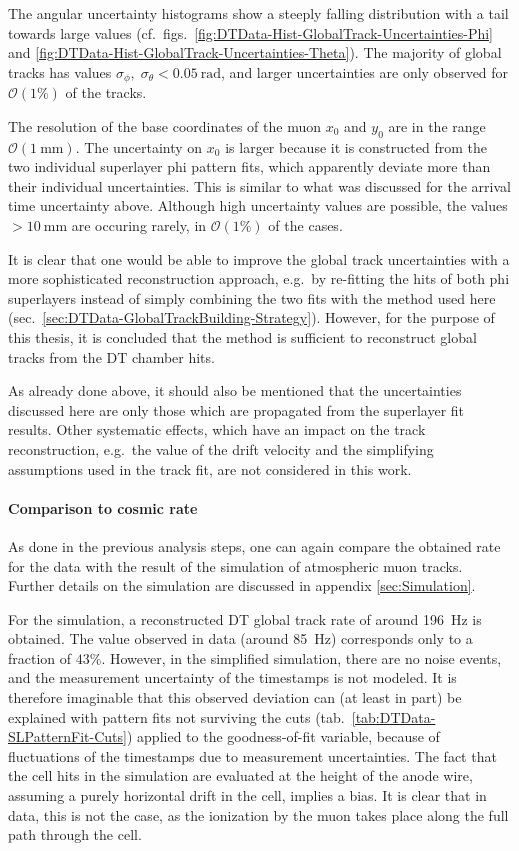 \par The angular uncertainty histograms show a steeply falling distribution with a tail towards large values (cf.\ figs.\ \ref{fig:DTData-Hist-GlobalTrack-Uncertainties-Phi} and \ref{fig:DTData-Hist-GlobalTrack-Uncertainties-Theta}). The majority of global tracks has values $\sigma_\phi,\;\sigma_\theta<\SI{0.05}{\radian}$, and larger uncertainties are only observed for $\mathcal{O}(1\%)$ of the tracks.
\par The resolution of the base coordinates of the muon $x_0$ and $y_0$ are in the range $\mathcal{O}(\SI{1}{\milli\meter})$. The uncertainty on $x_0$ is larger because it is constructed from the two individual superlayer phi pattern fits, which apparently deviate more than their individual uncertainties. This is similar to what was discussed for the arrival time uncertainty above. Although high uncertainty values are possible, the values $>\SI{10}{\milli\meter}$ are occuring rarely, in $\mathcal{O}(1\%)$ of the cases.
\par It is clear that one would be able to improve the global track uncertainties with a more sophisticated reconstruction approach, e.g.\ by re-fitting the hits of both phi superlayers instead of simply combining the two fits with the method used here (sec.\ \ref{sec:DTData-GlobalTrackBuilding-Strategy}). However, for the purpose of this thesis, it is concluded that the method is sufficient to reconstruct global tracks from the \ac{DT} chamber hits.
\par As already done above, it should also be mentioned that the uncertainties discussed here are only those which are propagated from the superlayer fit results. Other systematic effects, which have an impact on the track reconstruction, e.g.\ the value of the drift velocity and the simplifying assumptions used in the track fit, are not considered in this work.

\paragraph{Comparison to cosmic rate}
As done in the previous analysis steps, one can again compare the obtained rate for the data with the result of the simulation of atmospheric muon tracks. Further details on the simulation are discussed in appendix \ref{sec:Simulation}.
\par For the simulation, a reconstructed \ac{DT} global track rate of around \SI{196}{\hertz} is obtained. The value observed in data (around \SI{85}{\hertz}) corresponds only to a fraction of $43\%$. However, in the simplified simulation, there are no noise events, and the measurement uncertainty of the timestamps is not modeled. It is therefore imaginable that this observed deviation can (at least in part) be explained with pattern fits not surviving the cuts (tab.\ \ref{tab:DTData-SLPatternFit-Cuts}) applied to the goodness-of-fit variable, because of fluctuations of the timestamps due to measurement uncertainties. The fact that the cell hits in the simulation are evaluated at the height of the anode wire, assuming a purely horizontal drift in the cell, implies a bias. It is clear that in data, this is not the case, as the ionization by the muon takes place along the full path through the cell.

